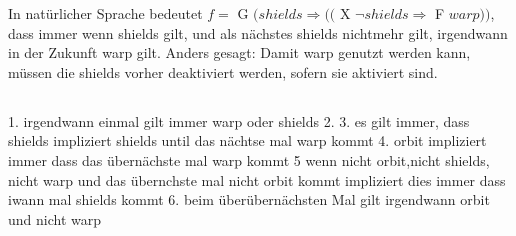 \documentclass[a4paper,12pt]{scrartcl}
\begin{document}
In natürlicher Sprache bedeutet
$f=$ G $(shields \Rightarrow (($ X $ \neg{shields} \Rightarrow $ F $warp))$,
 dass immer wenn shields gilt, und als nächstes shields nichtmehr gilt, 
irgendwann in der Zukunft warp gilt. Anders gesagt: Damit warp genutzt 
werden kann, müssen die shields vorher deaktiviert werden, sofern sie 
aktiviert sind.
\subsubsection{}
\subsection{}
1. irgendwann einmal gilt immer warp oder shields
2.
3. es gilt immer, dass shields impliziert shields until das nächtse mal warp kommt
4. orbit impliziert immer dass das übernächste mal warp kommt
5 wenn nicht orbit,nicht shields, nicht warp und das übernchste mal nicht orbit kommt impliziert dies immer dass iwann mal shields kommt
6. beim überübernächsten Mal gilt irgendwann orbit und nicht warp
%
\end{document}
